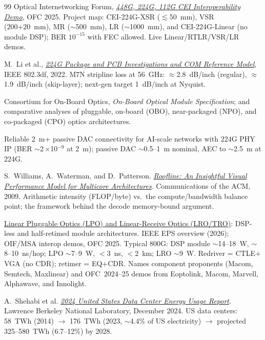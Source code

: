 \begin{thebibliography}{99}
Optical Internetworking Forum,
\emph{\href{https://www.oiforum.com/wp-content/uploads/OIF_CEI_Demo_OFC2025.pdf}{448G, 224G, 112G CEI Interoperability Demo}},
OFC 2025.
\newblock Project map: CEI-224G-XSR ($\lesssim$50~mm), VSR (200+20~mm), MR
($\sim$500~mm), LR ($\sim$1000~mm), and CEI-224G-Linear (no module DSP);
BER $10^{-15}$ with FEC allowed. Live Linear/RTLR/VSR/LR demos.

M.~Li et al., \emph{\href{https://www.ieee802.org/3/df/public/22_07/li_3df_01a_2207.pdf}{224G Package and PCB Investigations and COM Reference Model}},
IEEE 802.3df, 2022.
\newblock M7N stripline loss at 56~GHz: $\approx$2.8~dB/inch (regular),
$\approx$1.9~dB/inch (skip-layer); next-gen target 1~dB/inch at Nyquist.

Consortium for On-Board Optics, \emph{On-Board Optical Module Specification}; and
comparative analyses of pluggable, on-board (OBO), near-packaged (NPO), and
co-packaged (CPO) optics architectures.

Reliable 2~m+ passive DAC connectivity for AI-scale networks with 224G PHY IP
(BER $\sim$2\,$\times$10$^{-9}$ at 2~m); passive DAC $\sim$0.5--1~m nominal, AEC to
$\sim$2.5~m at 224G.

S.~Williams, A.~Waterman, and D.~Patterson.
\newblock \emph{\href{https://doi.org/10.1145/1498765.1498785}{Roofline: An Insightful Visual Performance Model for Multicore
Architectures}}. Communications of the ACM, 2009.
\newblock Arithmetic intensity (FLOP/byte) vs.\ the compute/bandwidth balance
point; the framework behind the decode memory-bound argument.

\href{https://eps.ieee.org/wp-content/uploads/2026/03/Linear-Pluggable-Optics_V2-UPDATED.pdf}{Linear Pluggable Optics (LPO) and Linear-Receive Optics (LRO/TRO)}: DSP-less and
half-retimed module architectures.
\newblock IEEE EPS overview (2026); OIF/MSA interop demos, OFC 2025. Typical 800G:
DSP module $\sim$14--18~W, $\sim$8--10~ns/hop; LPO $\sim$7--9~W, $<$3~ns, $<$2~km;
LRO $\sim$9~W. Redriver = CTLE$+$VGA (no CDR); retimer = EQ$+$CDR.
Names component proponents (Macom, Semtech, Maxlinear) and OFC~2024--25 demos
from Eoptolink, Macom, Marvell, Alphawave, and Innolight.

A.~Shehabi et al.
\newblock \emph{\href{https://eta-publications.lbl.gov/sites/default/files/2024-12/lbnl-2024-united-states-data-center-energy-usage-report.pdf}{2024
United States Data Center Energy Usage Report}}. Lawrence Berkeley National
Laboratory, December 2024.
\newblock US data centers: 58~TWh (2014) $\to$ 176~TWh (2023, $\sim$4.4\% of US
electricity) $\to$ projected 325--580~TWh (6.7--12\%) by 2028.


\end{thebibliography}

